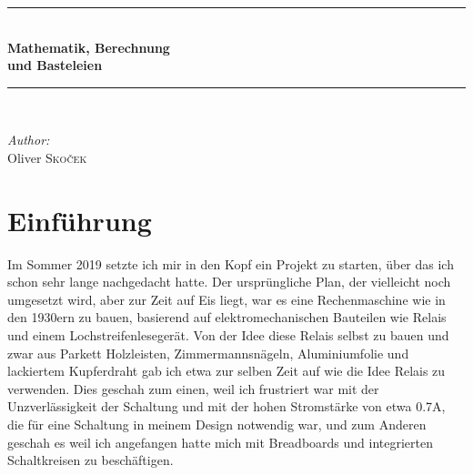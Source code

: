 \documentclass[11pt,a4paper,leqno]{report}
\numberwithin{equation}{chapter}
\begin{document}
\begin{titlepage}

\vspace*{5cm}
\begin{center}
\rule{\linewidth}{0.5mm} \\[0.4cm]
{ \Huge \bfseries Mathematik, Berechnung} \\[0.2cm]
{ \Huge \bfseries und Basteleien}\\[0.2cm]
\rule{\linewidth}{0.5mm} \\[3.5cm]
\begin{minipage}[t]{0.4\textwidth}
\begin{flushleft} \large
\emph{Author:}\\
Oliver \textsc{Sko\v{c}ek} \\[4cm]
\small

\end{flushleft}

\end{minipage}
\begin{minipage}[t]{0.4\textwidth}

\end{minipage}
 

 
\end{center}
 
\end{titlepage}




\tableofcontents


\vfill


\chapter*{Einf\"uhrung}
Im Sommer 2019 setzte ich mir in den Kopf ein Projekt zu starten, \"uber das ich schon sehr lange nachgedacht hatte. Der urspr\"ungliche Plan, der vielleicht noch umgesetzt wird, aber zur Zeit auf Eis liegt, war es eine Rechenmaschine wie in den 1930ern zu bauen, basierend auf elektromechanischen Bauteilen wie Relais und einem Lochstreifenleseger\"at. Von der Idee diese Relais selbst zu bauen und zwar aus Parkett Holzleisten, Zimmermannsn\"ageln, Aluminiumfolie und lackiertem Kupferdraht gab ich etwa zur selben Zeit auf wie die Idee Relais zu verwenden. Dies geschah zum einen, weil ich frustriert war mit der Unzverl\"assigkeit der Schaltung und mit der hohen Stromst\"arke von etwa 0.7A, die f\"ur eine Schaltung in meinem Design notwendig war, und zum Anderen geschah es weil ich angefangen hatte mich mit Breadboards und integrierten Schaltkreisen zu besch\"aftigen. 
\end{document}
